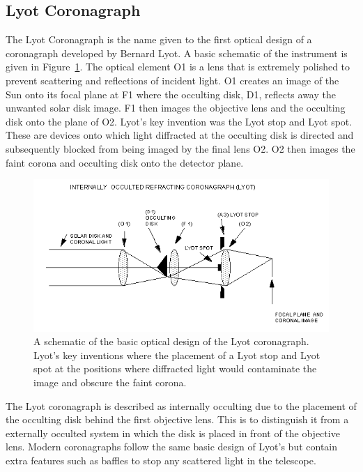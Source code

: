 \subsection{Lyot Coronagraph}\label{sec:22}
The Lyot Coronagraph is the name given to the first optical design of a coronagraph developed by Bernard Lyot. A basic schematic of the instrument is given in Figure~\ref{fig:lyot}. The optical element O1 is a lens that is extremely polished to prevent scattering and reflections of incident light. O1 creates an image of the Sun onto its focal plane at F1 where the occulting disk, D1, reflects away the unwanted solar disk image. F1 then images the objective lens and the occulting disk onto the plane of O2. Lyot's key invention was the Lyot stop and Lyot spot. These are devices onto which light diffracted at the occulting disk is directed and subsequently blocked from being imaged by the final lens O2. O2 then images the faint corona and occulting disk onto the detector plane. 
\begin{figure}[!t]
\begin{center}
\includegraphics[trim=0cm 1.0cm 0cm 0cm, scale=0.8]{images/Lyot_coronagraph}
\caption[The Lyot coronagraph]{A schematic of the basic optical design of the Lyot coronagraph. Lyot's key inventions where the placement of a Lyot stop and Lyot spot at the positions where diffracted light would contaminate the image and obscure the faint corona.}
\label{fig:lyot}
\end{center}
\end{figure}

The Lyot coronagraph is described as internally occulting due to the placement of the occulting disk behind the first objective lens. This is to distinguish it from a externally occulted system in which the disk is placed in front of the objective lens. Modern coronagraphs follow the same basic design of Lyot's but contain extra features such as baffles to stop any scattered light in the telescope. 

